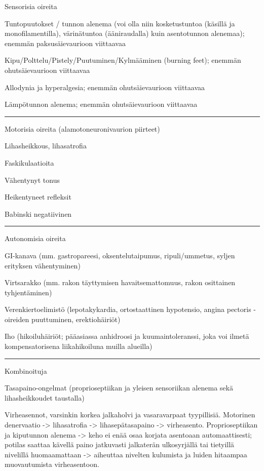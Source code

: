 \documentclass[
]{book}
\begin{document}
Sensorisia oireita

Tuntopuutokset / tunnon alenema (voi olla niin kosketustuntoa (käsillä ja monofilamentilla), värinätuntoa (ääniraudalla) kuin asentotunnon alenemaa); enemmän paksusäievaurioon viittaavaa

Kipu/Polttelu/Pistely/Puutuminen/Kylmääminen (burning feet); enemmän ohutsäievaurioon viittaavaa

Allodynia ja hyperalgesia; enemmän ohutsäievaurioon viittaavaa

Lämpötunnon alenema; enemmän ohutsäievaurioon viittaavaa

\begin{center}\rule{0.5\linewidth}{0.5pt}\end{center}

Motorisia oireita (alamotoneuronivaurion piirteet)

Lihasheikkous, lihasatrofia

Faskikulaatioita

Vähentynyt tonus

Heikentyneet refleksit

Babinski negatiivinen

\begin{center}\rule{0.5\linewidth}{0.5pt}\end{center}

Autonomisia oireita

GI-kanava (mm. gastropareesi, oksentelutaipumus, ripuli/ummetus, syljen erityksen vähentyminen)

Virtsarakko (mm. rakon täyttymisen havaitsemattomuus, rakon osittainen tyhjentäminen)

Verenkiertoelimistö (lepotakykardia, ortostaattinen hypotensio, angina pectoris -oireiden puuttuminen, erektiohäiriöt)

Iho (hikoiluhäiriöt; pääasiassa anhidroosi ja kuumaintoleranssi, joka voi ilmetä kompensatorisena liikahikoiluna muilla alueilla)

\begin{center}\rule{0.5\linewidth}{0.5pt}\end{center}

Kombinoituja

Tasapaino-ongelmat (proprioseptiikan ja yleisen sensoriikan alenema sekä lihasheikkoudet taustalla)

Virheasennot, varsinkin korkea jalkaholvi ja vasaravarpaat tyypillisiä. Motorinen denervaatio -\textgreater{} lihasatrofia -\textgreater{} lihasepätasapaino -\textgreater{} virheasento. Proprioseptiikan ja kiputunnon alenema -\textgreater{} keho ei enää osaa korjata asentoaan automaattisesti; potilas saattaa kävellä paino jatkuvasti jalkaterän ulkosyrjällä tai tietyillä nivelillä huomaamattaan -\textgreater{} aiheuttaa nivelten kulumista ja luiden hitaampaa muovautumista virheasentoon.
\end{document}
